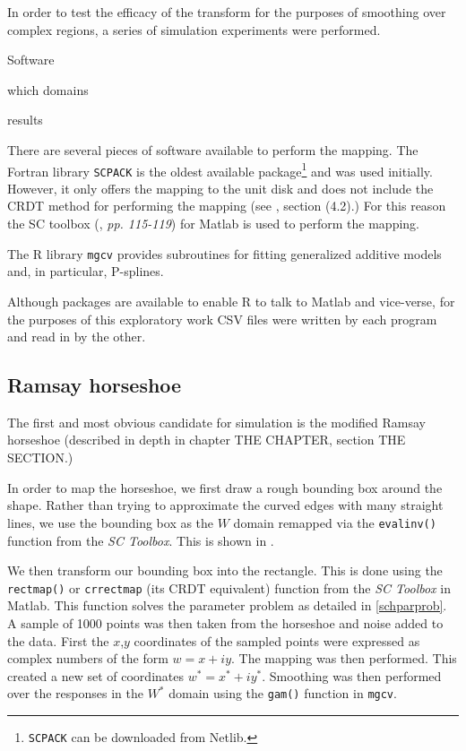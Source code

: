 In order to test the efficacy of the \sch transform for the purposes of smoothing over complex regions, a series of simulation experiments were performed.

\bi
	\item Software
	\item which domains
	\item results
\ei


There are several pieces of software available to perform the \sch mapping. The Fortran library \texttt{SCPACK} is the oldest available package\footnote{\texttt{SCPACK} can be downloaded from Netlib.} and was used initially. However, it only offers the mapping to the unit disk and does not include the CRDT method for performing the mapping (see \cite{miller08}, section (4.2).) For this reason the SC toolbox (\cite{driscoll}, \emph{pp. 115-119}) for Matlab is used to perform the mapping. 

The \textsf{R} library \texttt{mgcv} provides subroutines for fitting generalized additive models and, in particular, P-splines.

Although packages are available to enable \textsf{R} to talk to Matlab and vice-verse, for the purposes of this exploratory work CSV files were written by each program and read in by the other.

\subsection{Ramsay horseshoe}

The first and most obvious candidate for simulation is the modified Ramsay horseshoe (described in depth in chapter THE CHAPTER, section THE SECTION.)

In order to map the horseshoe, we first draw a rough bounding box around the shape. Rather than trying to approximate the curved edges with many straight lines, we use the bounding box as the $W$ domain remapped via the \texttt{evalinv()} function from the \emph{SC Toolbox}. This is shown in .

We then transform our bounding box into the rectangle. This is done using the \texttt{rectmap()} or \texttt{crrectmap} (its CRDT equivalent) function from the \emph{SC Toolbox} in Matlab. This function solves the \sch parameter problem as detailed in \ref{schparprob}. A sample of 1000 points was then taken from the horseshoe and noise added to the data. First the $x$,$y$ coordinates of the sampled points were expressed as complex numbers of the form $w=x+iy$. The mapping was then performed. This created a new set of coordinates $w^*=x^*+iy^*$. Smoothing was then performed over the responses in the $W^*$ domain using the \texttt{gam()} function in \texttt{mgcv}. 

